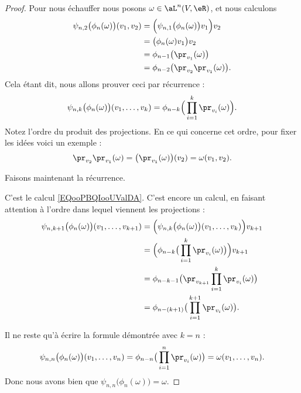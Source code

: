 \begin{proof}
	Pour nous échauffer nous posons \( \omega\in\aL^n(V,\eR)\), et nous calculons
	\begin{subequations}        \label{EQooPBQIooUValDA}
		\begin{align}
			\psi_{n,2}\big( \phi_n(\omega) \big)(v_1,v_2) & =\Big( \psi_{n,1}\big( \phi_n(\omega) \big)v_1 \Big)v_2 \\
			                                              & =\big( \phi_n(\omega)v_1 \big)v_2                       \\
			                                              & =\phi_{n-1}\big( \pr_{v_1}(\omega) \big)                \\
			                                              & =\phi_{n-2}\big( \pr_{v_2}\pr_{v_1}(\omega) \big).
		\end{align}
	\end{subequations}
	Cela étant dit, nous allons prouver ceci par récurrence :
	\begin{equation}
		\psi_{n,k}\big( \phi_n(\omega) \big)(v_1,\ldots, v_k)=\phi_{n-k}\Big( \prod_{i=1}^k\pr_{v_i}(\omega) \Big).
	\end{equation}
	Notez l'ordre du produit des projections. En ce qui concerne cet ordre, pour fixer les idées voici un exemple :
	\begin{equation}
		\pr_{v_2}\pr_{v_1}(\omega)=\big( \pr_{v_1}(\omega) \big)(v_2)=\omega(v_1,v_2).
	\end{equation}

	Faisons maintenant la récurrence.
	\begin{subproof}
		\spitem[Pour \( k=2\)]
		C'est le calcul \eqref{EQooPBQIooUValDA}.
		\spitem[Pour \( k+1\)]
		C'est encore un calcul, en faisant attention à l'ordre dans lequel viennent les projections :
		\begin{subequations}
			\begin{align}
				\psi_{n,k+1}\big( \phi_n(\omega) \big)(v_1,\ldots, v_{k+1}) & =\Big( \psi_{n,k}\big( \phi_n(\omega) \big)(v_1,\ldots, v_k) \Big)v_{k+1} \\
				                                                            & =\Big( \phi_{n-k}\big( \prod_{i=1}^k\pr_{v_i}(\omega) \big) \Big)v_{k+1}  \\
				                                                            & =\phi_{n-k-1}\big( \pr_{v_{k+1}}\prod_{i=1}^k\pr_{v_i}(\omega) \big)      \\
				                                                            & =\phi_{n-(k+1)}\big( \prod_{i=1}^{k+1}\pr_{v_i}(\omega) \big).
			\end{align}
		\end{subequations}
	\end{subproof}
	Il ne reste qu'à écrire la formule démontrée avec \( k=n\) :
	\begin{equation}
		\psi_{n,n}\big( \phi_n(\omega) \big)(v_1,\ldots, v_n)=\phi_{n-n}\big( \prod_{i=1}^n\pr_{v_i}(\omega) \big)=\omega(v_1,\ldots, v_n).
	\end{equation}
	Donc nous avons bien que \( \psi_{n,n}\big( \phi_n(\omega) \big)=\omega\).
\end{proof}

